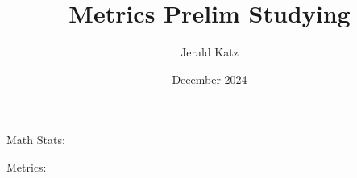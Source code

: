 \documentclass{article}
\title{Metrics Prelim Studying}
\author{Jerald Katz}
\date{December 2024}
\begin{document}
\maketitle

Math Stats:










Metrics:



\end{document}
